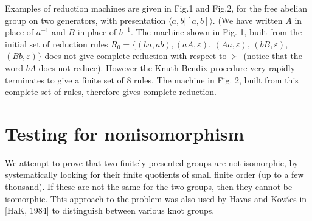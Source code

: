 Examples of reduction machines are given in Fig.1 and Fig.2, for the free 
abelian group on two generators, with presentation $\langle a , b | [a,b]
\rangle$. (We have written $A$ in place of $a^{-1}$ and $B$ in place of
$b^{-1}$. The machine shown in Fig. 1,
built from the initial set of reduction rules $R_0 =
\{ (ba,ab), (aA,\varepsilon )$, $(Aa,\varepsilon )$,
$(bB,\varepsilon)$,
$(Bb,\varepsilon ) \}$ does not give complete reduction with respect to
$\succ$
(notice that the word $bA$ does not reduce). However the Knuth Bendix
procedure very rapidly terminates to give a finite set of 8 rules. The  
machine in Fig. 2, built from this complete set of rules, therefore
gives complete reduction.\\
\vspace{150 mm}
\section{Testing for nonisomorphism}

We attempt to prove that two finitely presented groups are not isomorphic,
by systematically looking for their finite quotients of small finite
order (up to a few thousand).  If these are not the same for the two groups,
then they cannot be isomorphic. This approach to the problem was also used
by Havas and Kov\'{a}cs in [HaK, 1984] to distinguish between various knot
groups.

